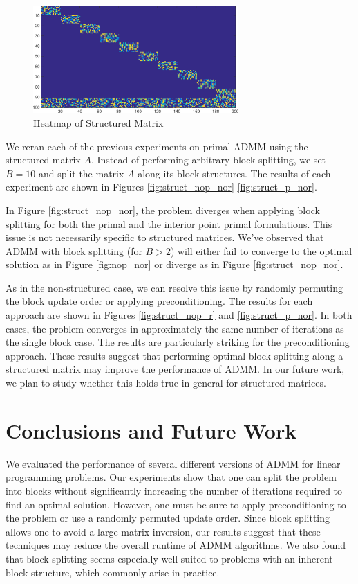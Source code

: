 \documentclass{article}
\begin{document}
{\begin{figure}[h]
	\centering
	\includegraphics[width=0.7\textwidth]{../figures/struct_prob.png}
	\caption{Heatmap of Structured Matrix}
	\label{fig:struct_prob}
\end{figure}

We reran each of the previous experiments on primal ADMM using the structured matrix $A$. Instead of performing arbitrary block splitting, we set $B=10$ and split the matrix $A$ along its block structures. The results of each experiment are shown in Figures \ref{fig:struct_nop_nor}-\ref{fig:struct_p_nor}.

In Figure \ref{fig:struct_nop_nor}, the problem diverges when applying block splitting for both the primal and the interior point primal formulations. This issue is not necessarily specific to structured matrices. We've observed that ADMM with block splitting (for $B>2$) will either fail to converge to the optimal solution as in Figure \ref{fig:nop_nor} or diverge as in Figure \ref{fig:struct_nop_nor}. 


As in the non-structured case, we can resolve this issue by randomly permuting the block update order or applying preconditioning. The results for each approach are shown in Figures \ref{fig:struct_nop_r} and \ref{fig:struct_p_nor}. In both cases, the problem converges in approximately the same number of iterations as the single block case. The results are particularly striking for the preconditioning approach. These results suggest that performing optimal block splitting along a structured matrix may improve the performance of ADMM. In our future work, we plan to study whether this holds true in general for structured matrices.

\vspace{0.2in}
\section{Conclusions and Future Work}

We evaluated the performance of several different versions of ADMM for linear programming problems. Our experiments show that one can split the problem into blocks without significantly increasing the number of iterations required to find an optimal solution. However, one must be sure to apply preconditioning to the problem or use a randomly permuted update order. Since block splitting allows one to avoid a large matrix inversion, our results suggest that these techniques may reduce the overall runtime of ADMM algorithms. We also found that block splitting seems especially well suited to problems with an inherent block structure, which commonly arise in practice.

}
\end{document}
